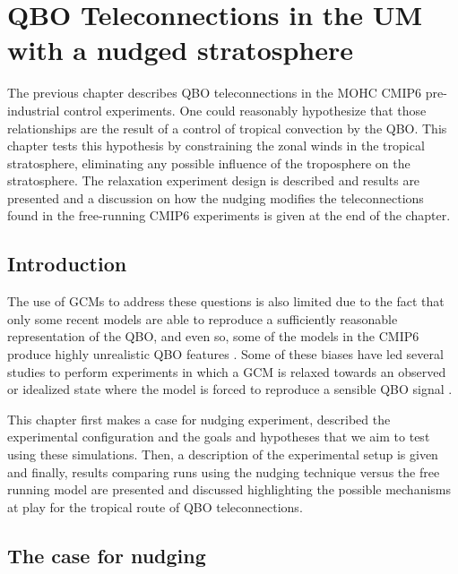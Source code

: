 \chapter{\label{ch:7-qbo} QBO Teleconnections in the UM with a nudged stratosphere }

The previous chapter describes QBO teleconnections in the MOHC CMIP6 pre-industrial control experiments. One could reasonably hypothesize that those relationships are the result of a control of tropical convection by the QBO. 
This chapter tests this hypothesis by constraining the zonal winds in the tropical stratosphere, eliminating any possible influence of the troposphere on the stratosphere. 
The relaxation experiment design is described and results are presented and a discussion on how the nudging modifies the teleconnections found in the free-running CMIP6 experiments is given at the end of the chapter. 

\section{Introduction}

The use of GCMs to address these questions is also limited due to the fact that only some recent models are able to reproduce a sufficiently reasonable representation of the QBO, and even so, some of the models in the CMIP6 produce highly unrealistic QBO features \citep{richter2020}. 
Some of these biases have led several studies to perform experiments in which a GCM is relaxed towards an observed or idealized state where the model is forced to reproduce a sensible QBO signal \citep{gray2020,richter2020,martin2021}. 

This chapter first makes a case for nudging experiment, described the experimental configuration and the goals and hypotheses that we aim to test using these simulations. 
Then, a description of the experimental setup is given and finally, results comparing runs using the nudging technique versus the free running model are presented and discussed highlighting the possible mechanisms at play for the tropical route of QBO teleconnections. 

\section{The case for nudging}

